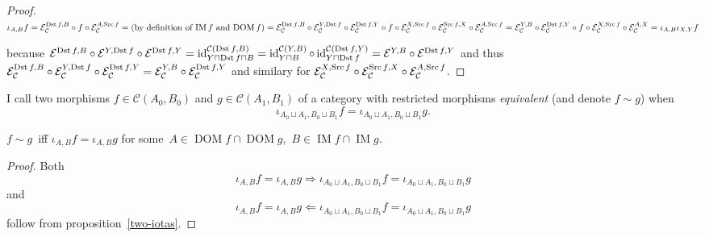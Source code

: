 \begin{proof}
  $\iota_{A, B} f =\mathcal{E}_{\mathcal{C}}^{\operatorname{Dst} f, B} \circ f \circ
  \mathcal{E}_{\mathcal{C}}^{A, \operatorname{Src} f} = \text{(by definition of
  $\operatorname{IM} f$ and $\operatorname{DOM} f$)} =\mathcal{E}_{\mathcal{C}}^{\operatorname{Dst} f,
  B} \circ \mathcal{E}_{\mathcal{C}}^{Y, \operatorname{Dst} f} \circ
  \mathcal{E}_{\mathcal{C}}^{\operatorname{Dst} f, Y} \circ f \circ
  \mathcal{E}_{\mathcal{C}}^{X, \operatorname{Src} f} \circ
  \mathcal{E}_{\mathcal{C}}^{\operatorname{Src} f, X} \circ
  \mathcal{E}_{\mathcal{C}}^{A, \operatorname{Src} f} =\mathcal{E}_{\mathcal{C}}^{Y,
  B} \circ \mathcal{E}_{\mathcal{C}}^{\operatorname{Dst} f, Y} \circ f \circ
  \mathcal{E}_{\mathcal{C}}^{X, \operatorname{Src} f} \circ
  \mathcal{E}_{\mathcal{C}}^{A, X} = \iota_{A, B} \iota_{X, Y} f$
  
  because $\mathcal{E}^{\operatorname{Dst} f, B} \circ \mathcal{E}^{Y, \operatorname{Dst} f}
  \circ \mathcal{E}^{\operatorname{Dst} f, Y} = \operatorname{id}^{\mathcal{C}(\operatorname{Dst} f, B)}_{Y \sqcap
  \operatorname{Dst} f \sqcap B} = \operatorname{id}^{\mathcal{C}(Y, B)}_{Y \sqcap B} \circ \operatorname{id}^{\mathcal{C}(\operatorname{Dst} f,Y)}_{Y \sqcap \operatorname{Dst} f} = \mathcal{E}^{Y, B} \circ
  \mathcal{E}^{\operatorname{Dst} f, Y}$ and thus
  $\mathcal{E}_{\mathcal{C}}^{\operatorname{Dst} f, B} \circ
  \mathcal{E}_{\mathcal{C}}^{Y, \operatorname{Dst} f} \circ
  \mathcal{E}_{\mathcal{C}}^{\operatorname{Dst} f, Y} =\mathcal{E}_{\mathcal{C}}^{Y,
  B} \circ \mathcal{E}_{\mathcal{C}}^{\operatorname{Dst} f, Y}$ and similary for
  $\mathcal{E}_{\mathcal{C}}^{X, \operatorname{Src} f} \circ
  \mathcal{E}_{\mathcal{C}}^{\operatorname{Src} f, X} \circ
  \mathcal{E}_{\mathcal{C}}^{A, \operatorname{Src} f}$.
\end{proof}

\begin{defn}
I call two morphisms $f\in\mathcal{C}(A_0,B_0)$ and
$g\in\mathcal{C}(A_1,B_1)$
of a category with restricted morphisms \emph{equivalent}
(and denote $f\sim g$) when
\[\iota_{A_0\sqcup A_1,B_0\sqcup B_1}f=\iota_{A_0\sqcup A_1,B_0\sqcup B_1}g.\]
\end{defn}

\begin{prop}
$f\sim g$~iff $\iota_{A,B}f=\iota_{A,B}g$ for
some~$A\in\operatorname{DOM}f\cap\operatorname{DOM}g$,~$B\in\operatorname{IM}f\cap\operatorname{IM}g$.
\end{prop}

\begin{proof}
Both
\[\iota_{A,B}f=\iota_{A,B}g\Rightarrow
\iota_{A_0\sqcup A_1,B_0\sqcup B_1}f=\iota_{A_0\sqcup A_1,B_0\sqcup B_1}g\]
and
\[\iota_{A,B}f=\iota_{A,B}g\Leftarrow
\iota_{A_0\sqcup A_1,B_0\sqcup B_1}f=\iota_{A_0\sqcup A_1,B_0\sqcup B_1}g\]
follow from proposition~\ref{two-iotas}.
\end{proof}

